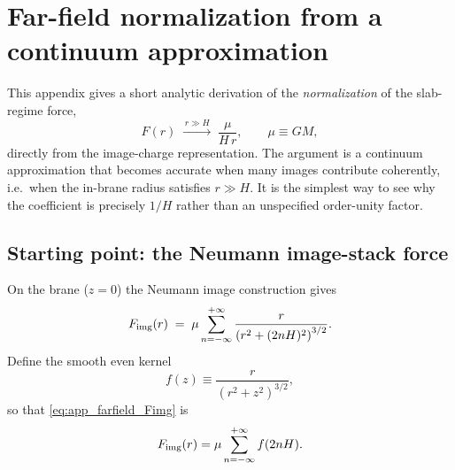 \documentclass[11pt]{article}
\begin{document}
\appendix

\section{Far-field normalization from a continuum approximation}
\label{app:farfield}

This appendix gives a short analytic derivation of the \emph{normalization} of the slab-regime force,
\begin{equation}
  F(r)\;\xrightarrow{\,r\gg H\,}\;\frac{\mu}{H\,r},
  \qquad \mu\equiv GM,
\end{equation}
directly from the image-charge representation.  The argument is a continuum approximation that
becomes accurate when many images contribute coherently, i.e.\ when the in-brane radius satisfies
$r\gg H$.  It is the simplest way to see why the coefficient is precisely $1/H$ rather than an
unspecified order-unity factor.

\subsection{Starting point: the Neumann image-stack force}
On the brane ($z=0$) the Neumann image construction gives
\begin{equation}
  F_{\rm img}(r)
  \;=\;
  \mu \sum_{n=-\infty}^{+\infty}
  \frac{r}{\left(r^2+(2nH)^2\right)^{3/2}}.
  \label{eq:app_farfield_Fimg}
\end{equation}
Define the smooth even kernel
\begin{equation}
  f(z)\equiv \frac{r}{(r^2+z^2)^{3/2}},
\end{equation}
so that \eqref{eq:app_farfield_Fimg} is
\begin{equation}
  F_{\rm img}(r) = \mu \sum_{n=-\infty}^{+\infty} f(2nH).
  \label{eq:app_farfield_sum}
\end{equation}
\end{document}

